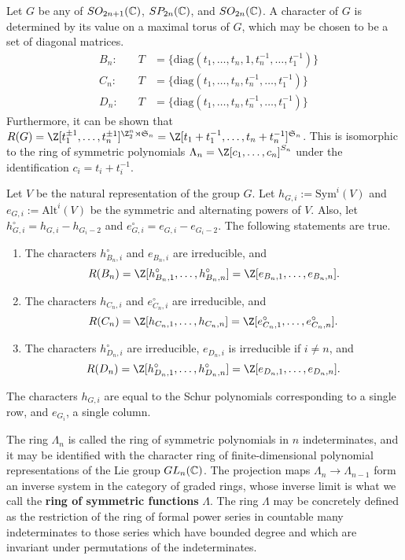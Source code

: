 Let $G$ be any of $SO_{2n+1}(\mathbb{C})$, $SP_{2n}(\mathbb{C})$, and $SO_{2n}(\mathbb{C})$. A character of $G$ is determined by its value on a maximal torus of $G$, which may be chosen to be a set of diagonal matrices. 
\begin{align*}
&B_n: &\quad T &= \{ \textrm{diag}(t_1, \dots, t_n, 1, t_n^{-1}, \dots, t_1^{-1}) \} \\ 
&C_n: &\quad T &= \{ \textrm{diag}(t_1, \dots, t_n, t_n^{-1}, \dots, t_1^{-1}) \} \\ 
&D_n: &\quad T &= \{ \textrm{diag}(t_1, \dots, t_n, t_n^{-1}, \dots, t_1^{-1}) \}
\end{align*}
Furthermore, it can be shown that $R(G) = \Z[t_1^{\pm 1}, \dots, t_n^{\pm 1}]^{\Z_2^n \rtimes \mathfrak{S}_n} = \Z[t_1+t_1^{-1}, \dots, t_n+t_n^{-1}]^{\mathfrak{S}_n}$. This is isomorphic to the ring of symmetric polynomials $\Lambda_n = \Z[c_1, \dots, c_n]^{S_n}$ under the identification $c_i = t_i + t_i^{-1}$. 

Let $V$ be the natural representation of the group $G$. Let $h_{G,i} := \textrm{Sym}^i(V)$ and $e_{G,i} := \textrm{Alt}^i(V)$ be the symmetric and alternating powers of $V$. Also, let $h_{G,i}^\circ = h_{G,i} - h_{G_i-2}$ and $e_{G,i}^\circ = e_{G,i} - e_{G_i-2}$. The following statements are true.
\begin{enumerate}
\item The characters $h_{B_n,i}^\circ$ and $e_{B_n,i}$ are irreducible, and \[R(B_n) = \Z[h_{B_n,1}^\circ, \dots, h_{B_n,n}^\circ] = \Z[e_{B_n,1}, \dots, e_{B_n,n}]. \]
\item The characters $h_{C_n,i}$ and $e_{C_n,i}^\circ$ are irreducible, and  \[R(C_n) = \Z[h_{C_n,1}, \dots, h_{C_n,n}] = \Z[e_{C_n,1}^\circ, \dots, e_{C_n,n}^\circ]. \]
\item The characters $h_{D_n,i}^\circ$ are irreducible, $e_{D_n,i}$ is irreducible if $i \neq n$, and \[R(D_n) = \Z[h_{D_n,1}^\circ, \dots, h_{D_n,n}^\circ] = \Z[e_{D_n,1}, \dots, e_{D_n,n}]. \]
\end{enumerate}
The characters $h_{G,i}$ are equal to the Schur polynomials corresponding to a single row, and $e_{G_i}$, a single column.

The ring $\Lambda_n$ is called the ring of symmetric polynomials in $n$ indeterminates, and it may be identified with the character ring of finite-dimensional polynomial representations of the Lie group $GL_n(\mathbb{C})$. The projection maps $\Lambda_n \to \Lambda_{n-1}$ form an inverse system in the category of graded rings, whose inverse limit is what we call the \textbf{ring of symmetric functions} $\Lambda$. The ring $\Lambda$ may be concretely defined as the restriction of the ring of formal power series in countable many indeterminates to those series which have bounded degree and which are invariant under permutations of the indeterminates. 

